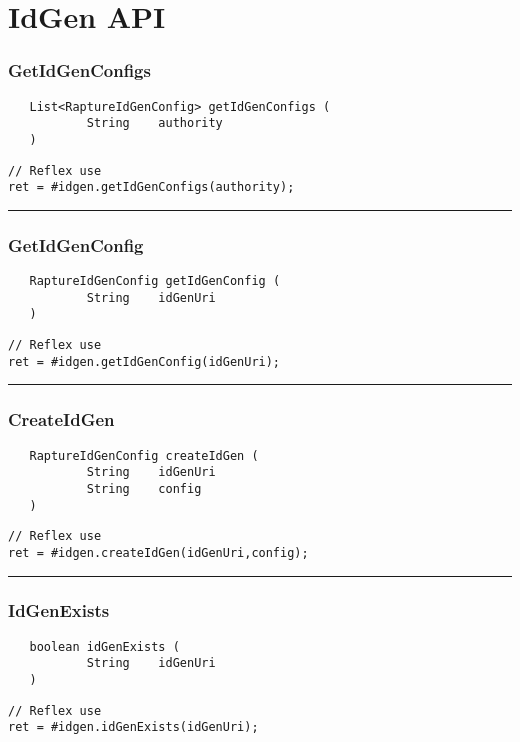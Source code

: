 \section{IdGen API}

\subsubsection{GetIdGenConfigs}
\label{Api:GetIdGenConfigs}
\begin{verbatim}
   List<RaptureIdGenConfig> getIdGenConfigs (
           String    authority
   )
\end{verbatim}
\begin{lstlisting}[language=reflex]
// Reflex use
ret = #idgen.getIdGenConfigs(authority);
\end{lstlisting}



\rule{15cm}{2pt}
\subsubsection{GetIdGenConfig}
\label{Api:GetIdGenConfig}
\begin{verbatim}
   RaptureIdGenConfig getIdGenConfig (
           String    idGenUri
   )
\end{verbatim}
\begin{lstlisting}[language=reflex]
// Reflex use
ret = #idgen.getIdGenConfig(idGenUri);
\end{lstlisting}



\rule{15cm}{2pt}
\subsubsection{CreateIdGen}
\label{Api:CreateIdGen}
\begin{verbatim}
   RaptureIdGenConfig createIdGen (
           String    idGenUri
           String    config
   )
\end{verbatim}
\begin{lstlisting}[language=reflex]
// Reflex use
ret = #idgen.createIdGen(idGenUri,config);
\end{lstlisting}



\rule{15cm}{2pt}
\subsubsection{IdGenExists}
\label{Api:IdGenExists}
\begin{verbatim}
   boolean idGenExists (
           String    idGenUri
   )
\end{verbatim}
\begin{lstlisting}[language=reflex]
// Reflex use
ret = #idgen.idGenExists(idGenUri);
\end{lstlisting}



